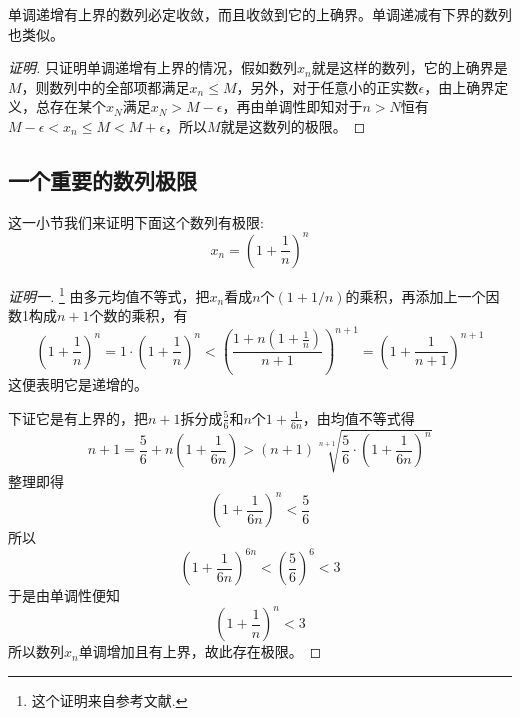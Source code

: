 \begin{theorem}
  单调递增有上界的数列必定收敛，而且收敛到它的上确界。单调递减有下界的数列也类似。
\end{theorem}

\begin{proof}[证明]
  只证明单调递增有上界的情况，假如数列$x_n$就是这样的数列，它的上确界是$M$，则数列中的全部项都满足$x_n \leqslant M$，另外，对于任意小的正实数$\epsilon$，由上确界定义，总存在某个$x_N$满足$x_N>M-\epsilon$，再由单调性即知对于$n>N$恒有$M-\epsilon < x_n \leqslant M < M+\epsilon$，所以$M$就是这数列的极限。
\end{proof}

\subsection{一个重要的数列极限}
\label{sec:a-import-sequence-limit}

这一小节我们来证明下面这个数列有极限:
\[ x_n=\left( 1+\frac{1}{n} \right)^n \]

\begin{proof}[证明一]\footnote{这个证明来自参考文献\cite{olympic-math}.}
  由多元均值不等式，把$x_n$看成$n$个$(1+1/n)$的乘积，再添加上一个因数1构成$n+1$个数的乘积，有
  \[ \left( 1+\frac{1}{n} \right)^n = 1 \cdot \left( 1+\frac{1}{n} \right)^n < \left( \frac{1+n\left( 1+\frac{1}{n} \right)}{n+1} \right)^{n+1} = \left( 1+\frac{1}{n+1} \right)^{n+1} \]
  这便表明它是递增的。

  下证它是有上界的，把$n+1$拆分成$\frac{5}{6}$和$n$个$1+\frac{1}{6n}$，由均值不等式得
  \[ n+1 = \frac{5}{6} + n \left( 1+\frac{1}{6n} \right) > (n+1)\sqrt[n+1]{\frac{5}{6} \cdot \left( 1+\frac{1}{6n} \right)^n} \]
  整理即得
  \[ \left( 1+\frac{1}{6n} \right)^n < \frac{5}{6} \]
  所以
  \[ \left( 1+\frac{1}{6n} \right)^{6n} < \left( \frac{5}{6} \right)^6 < 3 \]
  于是由单调性便知
  \[ \left( 1+\frac{1}{n} \right)^n < 3 \]
  所以数列$x_n$单调增加且有上界，故此存在极限。
\end{proof}

